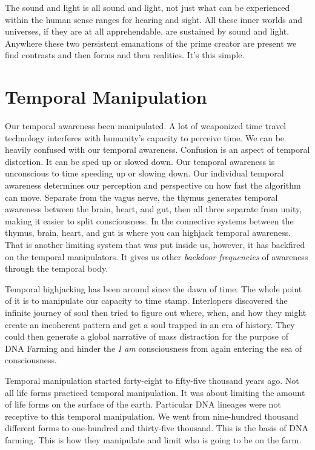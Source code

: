 \documentclass[letterpaper,9pt,twoside,titlepage,onecolumn,openany]{book}
\begin{document}
The sound and light is all sound and light, not just what can be
experienced within the human sense ranges for hearing and sight. All
these inner worlds and universes, if they are at all apprehendable, are
sustained by sound and light. Anywhere these two persistent emanations
of the prime creator are present we find contrasts and then forms and
then realities. It's this simple.

\section*{Temporal Manipulation}\label{temporal-manipulation}

Our temporal awareness been manipulated. A lot of weaponized time travel
technology interferes with humanity's capacity to perceive time. We can
be heavily confused with our temporal awareness. Confusion is an aspect
of temporal distortion. It can be sped up or slowed down. Our temporal
awareness is unconscious to time speeding up or slowing down. Our
individual temporal awareness determines our perception and perspective
on how fast the algorithm can move. Separate from the vagus nerve, the
thymus generates temporal awareness between the brain, heart, and gut,
then all three separate from unity, making it easier to split
consciousness. In the connective systems between the thymus, brain,
heart, and gut is where you can highjack temporal awareness. That is
another limiting system that was put inside us, however, it has
backfired on the temporal manipulators. It gives us other \emph{backdoor
frequencies} of awareness through the temporal body.

Temporal highjacking has been around since the dawn of time. The whole
point of it is to manipulate our capacity to time stamp. Interlopers
discovered the infinite journey of soul then tried to figure out where,
when, and how they might create an incoherent pattern and get a soul
trapped in an era of history. They could then generate a global
narrative of mass distraction for the purpose of DNA Farming and hinder
the \emph{I am} consciousness from again entering the sea of
consciousness.

Temporal manipulation started forty-eight to fifty-five thousand years
ago. Not all life forms practiced temporal manipulation. It was about
limiting the amount of life forms on the surface of the earth.
Particular DNA lineages were not receptive to this temporal
manipulation. We went from nine-hundred thousand different forms to
one-hundred and thirty-five thousand. This is the basis of DNA farming.
This is how they manipulate and limit who is going to be on the farm.
\end{document}
